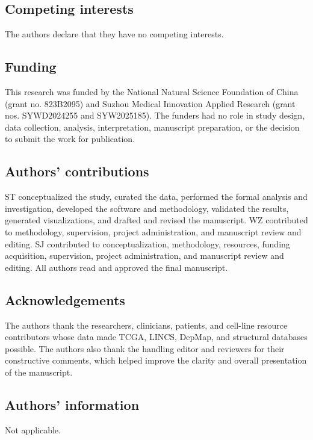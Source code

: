 \subsection*{Competing interests}
The authors declare that they have no competing interests.

\subsection*{Funding}
This research was funded by the National Natural Science Foundation of China (grant no. 823B2095) and Suzhou Medical Innovation Applied Research (grant nos. SYWD2024255 and SYW2025185). The funders had no role in study design, data collection, analysis, interpretation, manuscript preparation, or the decision to submit the work for publication.

\subsection*{Authors' contributions}
ST conceptualized the study, curated the data, performed the formal analysis and investigation, developed the software and methodology, validated the results, generated visualizations, and drafted and revised the manuscript. WZ contributed to methodology, supervision, project administration, and manuscript review and editing. SJ contributed to conceptualization, methodology, resources, funding acquisition, supervision, project administration, and manuscript review and editing. All authors read and approved the final manuscript.

\subsection*{Acknowledgements}
The authors thank the researchers, clinicians, patients, and cell-line resource contributors whose data made TCGA, LINCS, DepMap, and structural databases possible. The authors also thank the handling editor and reviewers for their constructive comments, which helped improve the clarity and overall presentation of the manuscript.

\subsection*{Authors' information}
Not applicable.

